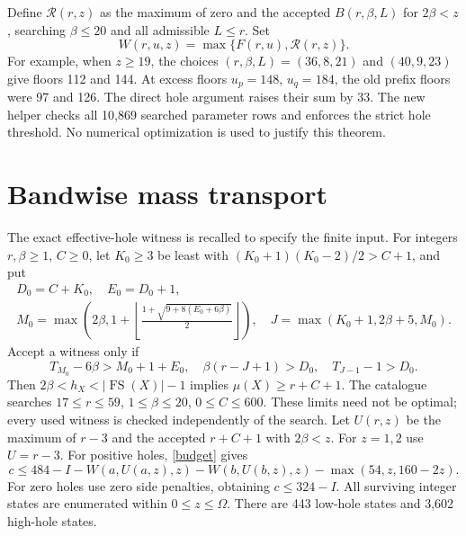 \documentclass[11pt,a4paper]{article}
\newcommand{\FS}{\operatorname{FS}}
\begin{document}
Define $\mathcal R(r,z)$ as the maximum of zero and the accepted
$B(r,\beta,L)$ for $2\beta<z$, searching $\beta\le20$ and all admissible
$L\le r$. Set
\[
 W(r,u,z)=\max\{F(r,u),\mathcal R(r,z)\}.
\]
For example, when $z\ge19$, the choices
$(r,\beta,L)=(36,8,21)$ and $(40,9,23)$ give floors 112 and 144.
At excess floors $u_p=148$, $u_q=184$, the old prefix floors were
97 and 126. The direct hole argument raises their sum by 33.
The new helper  checks all
10,869 searched parameter rows and enforces the strict hole threshold.
No numerical optimization is used to justify this theorem.

\section{Bandwise mass transport}
The exact effective-hole witness is recalled to specify the finite input.
For integers $r,\beta\ge1$, $C\ge0$, let $K_0\ge3$ be least with
$(K_0+1)(K_0-2)/2>C+1$, and put
\begin{gather*}
 D_0=C+K_0,\quad E_0=D_0+1,\\
 M_0=\max\left(2\beta,1+\left\lfloor
 \frac{1+\sqrt{9+8(E_0+6\beta)}}2\right\rfloor\right),\quad
 J=\max(K_0+1,2\beta+5,M_0).
\end{gather*}
Accept a witness only if
\[
 T_{M_0}-6\beta>M_0+1+E_0,\quad
 \beta(r-J+1)>D_0,\quad T_{J-1}-1>D_0.
\]
Then $2\beta<h_X<|\FS(X)|-1$ implies $\mu(X)\ge r+C+1$.
The catalogue searches $17\le r\le59$, $1\le\beta\le20$,
$0\le C\le600$. These limits need not be optimal; every used witness
is checked independently of the search.
Let $U(r,z)$ be the maximum of $r-3$ and the accepted $r+C+1$ with
$2\beta<z$. For $z=1,2$ use $U=r-3$.
For positive holes, \eqref{budget} gives
\begin{equation}\label{cap}
 c\le484-I-W(a,U(a,z),z)-W(b,U(b,z),z)-\max(54,z,160-2z).
\end{equation}
For zero holes use zero side penalties, obtaining $c\le324-I$.
All surviving integer states are enumerated within $0\le z\le\Omega$.
There are 443 low-hole states and 3,602 high-hole states.
\end{document}
